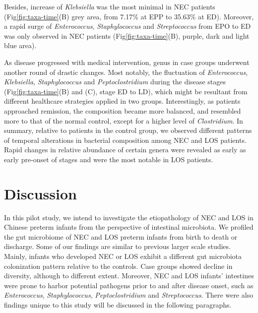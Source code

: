 \documentclass[fleqn,10pt, lineno]{wlpeerj} %
\begin{document}
    Besides, increase of \textit{Klebsiella} was the most minimal in NEC patients (Fig\ref{fig:taxa-time}(B) grey area, from 7.17\% at EPP to 35.63\% at ED).  Moreover, a rapid surge of \textit{Enterococcus}, \textit{Staphylococcus} and \textit{Streptococcus} from EPO to ED was only observed in NEC patients (Fig\ref{fig:taxa-time}(B), purple, dark and light blue area).

  	As disease progressed with medical intervention, genus in case groups underwent another round of drastic changes.  Most notably, the fluctuation of \textit{Enterococcus}, \textit{Klebsiella}, \textit{Staphylococcus} and \textit{Peptoclostridium} during the disease stages (Fig\ref{fig:taxa-time}(B) and (C), stage ED to LD), which might be resultant from different healthcare strategies applied in two groups. Interestingly, as patients approached remission, the composition became more balanced, and resembled more to that of the normal control, except for a higher level of \textit{Clostridium}.  In summary, relative to patients in the control group, we observed different patterns of temporal alterations in bacterial composition among NEC and LOS patients. Rapid changes in relative abundance of certain genera were revealed as early as early pre-onset of stages and were the most notable in LOS patients.


\section*{Discussion}
In this pilot study, we intend to investigate the etiopathology of NEC and LOS in Chinese preterm infants from the perspective of intestinal microbiota. We profiled the gut microbiome of NEC and LOS preterm infants from birth to death or discharge. Some of our findings are similar to previous larger scale studies.  Mainly, infants who developed NEC or LOS exhibit a different gut microbiota colonization pattern relative to the controls. Case groups showed decline in diversity, although to different extent. Moreover, NEC and LOS infants' intestines were prone to harbor potential pathogens prior to and after disease onset, such as \textit{Enterococcus}, \textit{Staphylococcus}, \textit{Peptoclostridium} and \textit{Streptococcus}. There were also findings unique to this study will be discussed in the following paragraphs.
\end{document}
